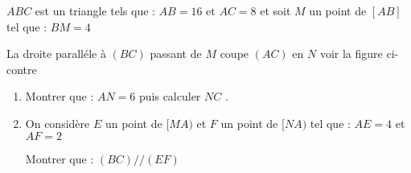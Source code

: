 \documentclass[a4paper,12pt]{article}
\begin{document}
\begin{exo}[9]
\begin{minipage}{0.4\linewidth}
\end{minipage}
\begin{minipage}{0.6\linewidth}
$ABC$ est un triangle tels que : $AB=16$ et $AC=8$ et soit  $M$ un point de  $[AB]$ tel que : $BM=4$

La droite paralléle à $(BC)$ passant de $M$ coupe  $(AC)$ en $N$ voir la figure ci-contre
\begin{enumerate}
\item Montrer que : $AN=6$ puis calculer $NC$ .
\item On considère $E$ un point de $[MA)$ et $F$ un point de $[NA)$ tel que : $AE=4$ et $AF=2$

Montrer que : $(BC)//(EF)$
\end{enumerate}
\end{minipage}%

\begin{minipage}{0.49\linewidth}
\anserline[24]
\end{minipage}
\hfill\vline\hfill
\begin{minipage}{0.49\linewidth}
\anserline[24]
\end{minipage}

\end{exo}
\newpage
\end{document}
